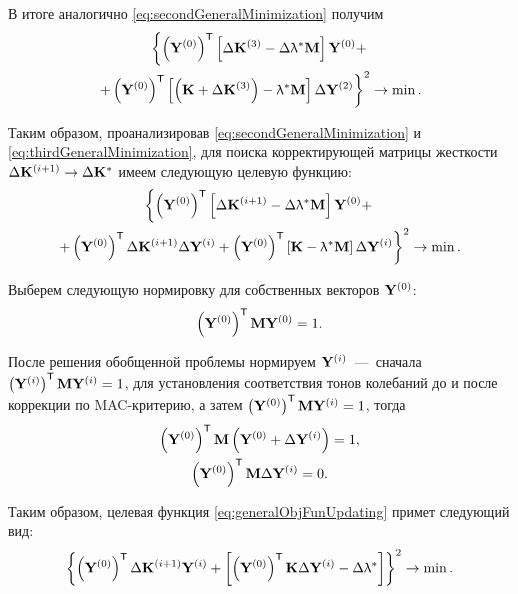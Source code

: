 В итоге аналогично \eqref{eq:secondGeneralMinimization} получим
\begin{gather}
	\left\{ \left( \mathbf{Y} ^ {(0)} \right) ^ \mathsf{T} \left[ \Delta \mathbf{K} ^ {(3)} - \Delta \uplambda ^ \ast \mathbf{M} \right] \mathbf{Y} ^ {(0)} + \right. \nonumber \\
	\left. + \left( \mathbf{Y} ^ {(0)} \right) ^ \mathsf{T} \left[ \left( \mathbf{K} + \Delta \mathbf{K} ^ {(3)} \right) - \uplambda ^ \ast \mathbf{M} \right] \Delta \mathbf{Y} ^ {(2)} \right\} ^ 2 \rightarrow \min.
	\label{eq:thirdGeneralMinimization}
\end{gather}

Таким образом, проанализировав \eqref{eq:secondGeneralMinimization} и \eqref{eq:thirdGeneralMinimization}, для
поиска корректирующей матрицы жесткости $ \Delta \mathbf{K} ^ {(i + 1)} \rightarrow \Delta \mathbf{K} ^ \ast $ имеем следующую целевую функцию:
\begin{gather}
	\left\{ \left( \mathbf{Y} ^ {(0)} \right) ^ \mathsf{T} \left[ \Delta \mathbf{K} ^ {(i + 1)} - \Delta \uplambda ^ \ast \mathbf{M} \right] \mathbf{Y} ^ {(0)} + \right. \nonumber \\
	\left. + \left( \mathbf{Y} ^ {(0)} \right) ^ \mathsf{T} \Delta \mathbf{K} ^ {(i + 1)} \Delta \mathbf{Y} ^ {(i)} + \left( \mathbf{Y} ^ {(0)} \right) ^ \mathsf{T} \left[ \mathbf{K} - \uplambda ^ \ast \mathbf{M} \right] \Delta \mathbf{Y} ^ {(i)} \right\} ^ 2 \rightarrow \min.
	\label{eq:generalObjFunUpdating}
\end{gather}

Выберем следующую нормировку для собственных векторов $ \mathbf{Y} ^ {(0)} $:
\begin{equation*}
	\left( \mathbf{Y} ^ {(0)} \right) ^ \mathsf{T} \mathbf{M} \mathbf{Y} ^ {(0)} = 1.
\end{equation*}

После решения обобщенной проблемы нормируем $ \mathbf{Y} ^ {(i)} $~---~сначала $ \left( \mathbf{Y} ^ {(i)} \right) ^ \mathsf{T} \mathbf{M} \mathbf{Y} ^ {(i)} = 1 $, для установления соответствия тонов колебаний до и после коррекции по MAC-критерию, а затем $ \left( \mathbf{Y} ^ {(0)} \right) ^ \mathsf{T} \mathbf{M} \mathbf{Y} ^ {(i)} = 1 $, тогда
\begin{gather*}
	\left( \mathbf{Y} ^ {(0)} \right) ^ \mathsf{T} \mathbf{M} \left( \mathbf{Y} ^ {(0)} + \Delta \mathbf{Y} ^ {(i)} \right) = 1, \\
	\left( \mathbf{Y} ^ {(0)} \right) ^ \mathsf{T} \mathbf{M} \Delta \mathbf{Y} ^ {(i)} = 0.
\end{gather*}

Таким образом, целевая функция \eqref{eq:generalObjFunUpdating} примет следующий вид:
\begin{equation}
	\left\{ \left( \mathbf{Y} ^ {(0)} \right) ^ \mathsf{T} \Delta \mathbf{K} ^ {(i + 1)} \mathbf{Y} ^ {(i)} + \left[ \left( \mathbf{Y} ^ {(0)} \right) ^ \mathsf{T} \mathbf{K} \Delta \mathbf{Y} ^ {(i)} - \Delta \uplambda ^ \ast \right] \right\} ^ 2 \rightarrow \min.
	\label{eq:finalObjFunUpdating}
\end{equation}

